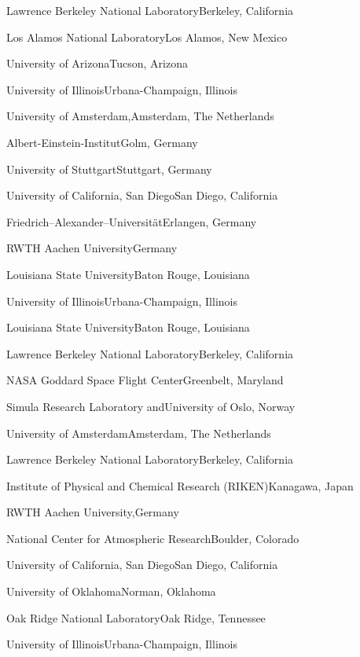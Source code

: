 \begin{multicols}{2}
 {Lawrence Berkeley National
Laboratory}{Berkeley, California}

 {Los Alamos National Laboratory}{Los Alamos,
New Mexico}

{University of Arizona}{Tucson, Arizona}

 {University of
Illinois}{Urbana-Champaign, Illinois}

 {University of
Amsterdam,}{Amsterdam, The Netherlands}

{Albert-Einstein-Institut}{Golm, Germany}

 {University of Stuttgart}{Stuttgart,
Germany}

 {University of California, San Diego}{San
Diego, California}

{Friedrich--Alexander--Universit{\"a}t}{Erlangen, Germany}

{RWTH Aachen University}{Germany}

{Louisiana State University}{Baton Rouge, Louisiana}

 {University of Illinois}{Urbana-Champaign,
Illinois}

{Louisiana State University}{Baton Rouge, Louisiana}

 {Lawrence Berkeley National
Laboratory}{Berkeley, California}

 {NASA Goddard Space Flight Center}{Greenbelt,
Maryland}

{Simula Research Laboratory and}{University of Oslo, Norway}

 {University of Amsterdam}{Amsterdam, The
Netherlands}

 {Lawrence Berkeley National
Laboratory}{Berkeley, California}

 {Institute of Physical and Chemical Research
(RIKEN)}{Kanagawa, Japan}

{RWTH Aachen University,}{Germany}

 {National Center for Atmospheric
Research}{Boulder, Colorado}

 {University of California, San Diego}{San
Diego, California}

 {University of Oklahoma}{Norman, Oklahoma}

 {Oak Ridge National Laboratory}{Oak
Ridge, Tennessee}

 {University of Illinois}{Urbana-Champaign,
Illinois}

\end{multicols}